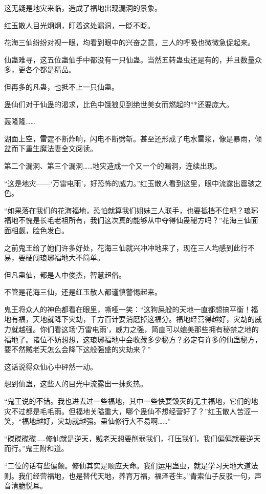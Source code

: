 \begin{this_body}
这无疑是地灾来临，造成了福地出现漏洞的景象。

红玉散人目光炯炯，盯着这处漏洞，一眨不眨。

花海三仙纷纷对视一眼，均看到眼中的兴奋之意，三人的呼吸也微微急促起来。

仙蛊难寻，这五位蛊仙手中都没有一只仙蛊。当然五转蛊虫还是有的，并且数量众多，更各个都是精品。

但再多的凡蛊，也抵不上一只仙蛊。

蛊仙们对于仙蛊的渴求，比色中饿狼见到绝世美女而燃起的**还要庞大。

轰隆隆……

湖面上空，雷霆不断炸响，闪电不断劈斩。甚至还形成了电水雷浆，像是暴雨，倾盆而下重生魔法妻全文阅读。

第二个漏洞、第三个漏洞……地灾造成一个又一个的漏洞，连续出现。

“这是地灾——‘万雷电雨’，好恐怖的威力。”红玉散人看到这里，眼中流露出震骇之色。

“如果落在我们的花海福地，恐怕就算我们姐妹三人联手，也要抵挡不住吧？琅琊福地不愧是长毛老祖所有，我们这次真的能够从中夺得仙蛊秘方吗？”花海三仙面面相觑，脸色发白。

之前鬼王给了她们许多好处，花海三仙就兴冲冲地来了，现在三人均感到此行不易，要硬闯琅琊福地大不简单。

但凡蛊仙，都是人中俊杰，智慧超俗。

不管是花海三仙，还是红玉散人都谨慎警惕起来。

鬼王将众人的神色都看在眼里，嘶哑一笑：“这狗屎般的天地一直都想搞平衡！福地有福，天地就降下灾劫，千方百计要消磨掉这福分。福地经营得越好，灾劫的威力就越强。你们看这场‘万雷电雨’，威力之强，简直可以媲美那些拥有秘禁之地的福地了。诸位不妨想想，这琅琊福地中会收藏多少秘方？必定有许多的仙蛊秘方，要不然贼老天怎么会降下这般强盛的灾劫来？”

这话说得众仙心中砰然一动。

想到仙蛊，这些人的目光中流露出一抹炙热。

“鬼王说的不错。我也进去过一些福地，其中一些快要毁灭的无主福地，它们的地灾不过都是毛毛雨。但福地关隘重大，哪个蛊仙不想经营好了？”红玉散人苦涩一笑，“福地越好，灾劫就越强。蛊仙修行大不易啊……”

“磔磔磔磔……修仙就是逆天，贼老天想要削弱我们，打压我们，我们偏偏就要逆天而行。”鬼王附和道。

“二位的话有些偏颇。修仙其实是顺应天命。我们运用蛊虫，就是学习天地大道法则。我们经营福地，也是替代天地，养育万福，福泽苍生。”青索仙子反驳一句，声音清脆悦耳。


\end{this_body}
